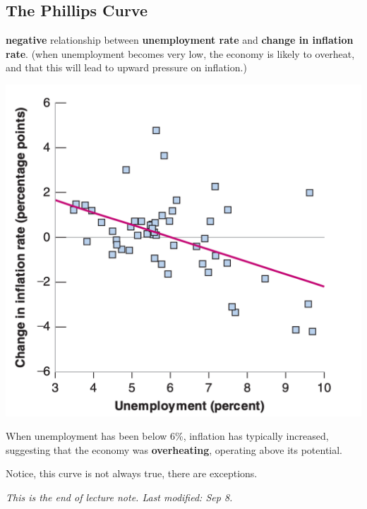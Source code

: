\documentclass[11pt, a4paper]{ECON2123}
\begin{document}
\begin{spacing}{1.5}
    \section{The Phillips Curve}

    {\bf negative} relationship between {\bf unemployment rate}
    and {\bf change in inflation rate}. 
    (when unemployment becomes very low, the economy is likely 
    to overheat, and that this will lead to upward pressure 
    on inflation.)
    \begin{center}
        \includegraphics[scale=0.3]{images/0102-phillips-curve.png}
    \end{center}

    When unemployment has been below 6\%, inflation has 
    typically increased, suggesting that the economy was 
    {\bf overheating}, operating above its potential. 

    Notice, this curve is not always true, there are exceptions.

    {\it This is the end of lecture note. Last modified: Sep 8.}

\end{spacing}
\end{document}

